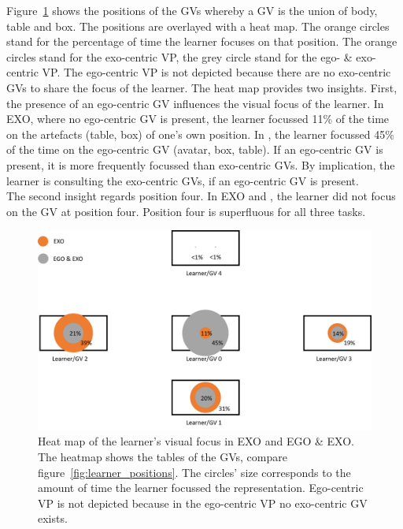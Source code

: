 Figure~\ref{fig:posHeatMap} shows the positions of the GVs whereby a GV is the union of body, table and box. The positions are overlayed with a heat map. The orange circles stand for the percentage of time the learner focuses on that position. The orange circles stand for the exo-centric VP, the grey circle stand for the ego- \& exo-centric VP. The ego-centric VP is not depicted because there are no exo-centric GVs to share the focus of the learner. The heat map provides two insights. First, the presence of an ego-centric GV influences the visual focus of the learner. In EXO, where no ego-centric GV is present, the learner focussed 11\% of the time on the artefacts (table, box) of one's own position. In \combi, the learner focussed 45\% of the time on the ego-centric GV (avatar, box, table). If an ego-centric GV is present, it is more frequently focussed than exo-centric GVs. By implication, the learner is consulting the exo-centric GVs, if an ego-centric GV is present.\\
The second insight regards position four. In EXO and \combi, the learner did not focus on the GV at position four. Position four is superfluous for all three tasks.
\begin{figure}[htb]
	\centering
	\includegraphics[width=\textwidth]{figures/positionHeatMap.png}
	\caption[\textit{Looking at} heat map.]{Heat map of the learner's visual focus in EXO and EGO \& EXO. The heatmap shows the tables of the GVs, compare figure~\ref{fig:learner_positions}. The circles' size corresponds to the amount of time the learner focussed the representation. Ego-centric VP is not depicted because in the ego-centric VP no exo-centric GV exists.}
	\label{fig:posHeatMap}
\end{figure}

